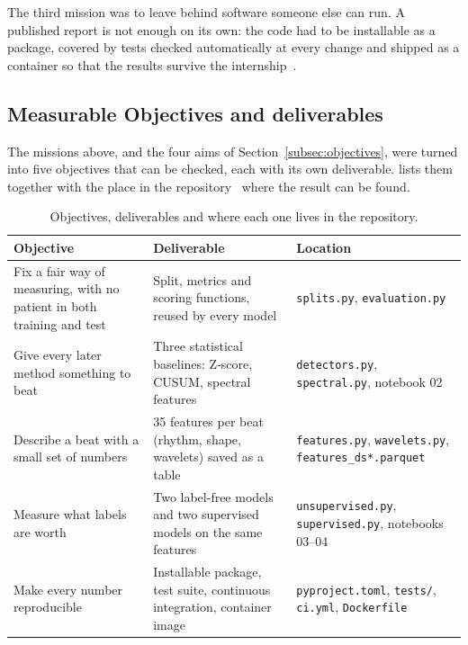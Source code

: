 \documentclass[a4paper, 12pt]{article}
\begin{document}
The third mission was to leave behind software someone else can run. A published 
report is not enough on its own: the code had to be installable as a package, covered
by tests checked automatically at every change and shipped as a container so that the 
results survive the internship~\cite{wilson2017goodpractices, sandve2013reproducible}.


\subsection{Measurable Objectives and deliverables} \label{subsec:deliverables}

The missions above, and the four aims of Section~\ref{subsec:objectives}, were
turned into five objectives that can be checked, each with its own deliverable.  lists them together with the place in
the repository~\cite{ammar2026repo} where the result can be found.


\begin{table}[htbp]
  \centering
  \small
  \caption{Objectives, deliverables and where each one lives in the repository.}
  \label{tab:deliverables}
  \begin{tabular}{@{}p{}p{}p{}@{}}
    \toprule
    \textbf{Objective} & \textbf{Deliverable} & \textbf{Location} \\
    \midrule
    Fix a fair way of measuring, with no patient in both training and test
      & Split, metrics and scoring functions, reused by every model
      & \texttt{splits.py}, \texttt{evaluation.py} \\
    \addlinespace
    Give every later method something to beat
      & Three statistical baselines: Z-score, CUSUM, spectral features
      & \texttt{detectors.py}, \texttt{spectral.py}, notebook 02 \\
    \addlinespace
    Describe a beat with a small set of numbers
      & 35 features per beat (rhythm, shape, wavelets) saved as a table
      & \texttt{features.py}, \texttt{wavelets.py}, \texttt{features\_ds*.parquet} \\
    \addlinespace
    Measure what labels are worth
      & Two label-free models and two supervised models on the same features
      & \texttt{unsupervised.py}, \texttt{supervised.py}, notebooks 03--04 \\
    \addlinespace
    Make every number reproducible
      & Installable package, test suite, continuous integration, container image
      & \texttt{pyproject.toml}, \texttt{tests/}, \texttt{ci.yml}, \texttt{Dockerfile} \\
    \bottomrule
  \end{tabular}
\end{table}
\end{document}
